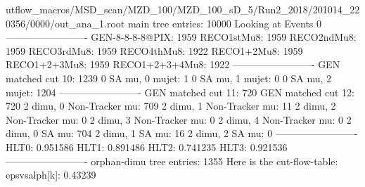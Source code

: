 utflow_macros/MSD_scan/MZD_100/MZD_100_sD_5/Run2_2018/201014_220356/0000/out_ana_1.root
main tree entries: 10000
Looking at Events 0
-------------------------
GEN-8-8-8-8@PIX: 1959
RECO1stMu8: 1959
RECO2ndMu8: 1959
RECO3rdMu8: 1959
RECO4thMu8: 1922
RECO1+2Mu8: 1959
RECO1+2+3Mu8: 1959
RECO1+2+3+4Mu8: 1922
-------------------------
GEN matched cut 10: 1239
0 SA mu, 0 mujet: 1
0 SA mu, 1 mujet: 0
0 SA mu, 2 mujet: 1204
-------------------------
GEN matched cut 11: 720
GEN matched cut 12: 720
2 dimu, 0 Non-Tracker mu: 709
2 dimu, 1 Non-Tracker mu: 11
2 dimu, 2 Non-Tracker mu: 0
2 dimu, 3 Non-Tracker mu: 0
2 dimu, 4 Non-Tracker mu: 0
2 dimu, 0 SA mu: 704
2 dimu, 1 SA mu: 16
2 dimu, 2 SA mu: 0
-------------------------
HLT0: 0.951586
HLT1: 0.891486
HLT2: 0.741235
HLT3: 0.921536
-------------------------
orphan-dimu tree entries: 1355
Here is the cut-flow-table:
epsvsalph[k]: 0.43239
        
